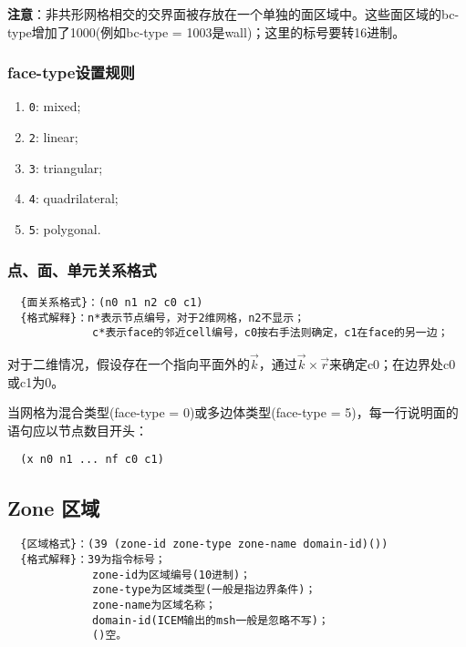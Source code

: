 \documentclass[lang=cn,11pt,a4paper]{elegantpaper}
\begin{document}
\textbf{注意}：非共形网格相交的交界面被存放在一个单独的面区域中。这些面区域的bc-type增加了1000(例如bc-type = 1003是wall)；这里的标号要转16进制。

\subsubsection{face-type设置规则}\label{face-type}
\begin{enumerate}[label=\arabic*).]
  \item \lstinline{0}: mixed;
  \item \lstinline{2}: linear;
  \item \lstinline{3}: triangular;
  \item \lstinline{4}: quadrilateral;
  \item \lstinline{5}: polygonal.
\end{enumerate}

\subsubsection{点、面、单元关系格式}
\begin{lstlisting}
  {面关系格式}：(n0 n1 n2 c0 c1)
  {格式解释}：n*表示节点编号，对于2维网格，n2不显示；
             c*表示face的邻近cell编号，c0按右手法则确定，c1在face的另一边；
\end{lstlisting}

对于二维情况，假设存在一个指向平面外的$\overrightarrow{k}$，通过$\overrightarrow{k}\times\overrightarrow{r}$来确定c0；在边界处c0或c1为0。

当网格为混合类型(face-type = 0)或多边体类型(face-type = 5)，每一行说明面的语句应以节点数目开头：
\begin{lstlisting}
  (x n0 n1 ... nf c0 c1) 
\end{lstlisting}

\subsection{Zone 区域}\label{Zone}
\begin{lstlisting}
  {区域格式}：(39 (zone-id zone-type zone-name domain-id)())
  {格式解释}：39为指令标号；
             zone-id为区域编号(10进制)；
             zone-type为区域类型(一般是指边界条件)；
             zone-name为区域名称；
             domain-id(ICEM输出的msh一般是忽略不写)；
             ()空。
\end{lstlisting}
\end{document}
